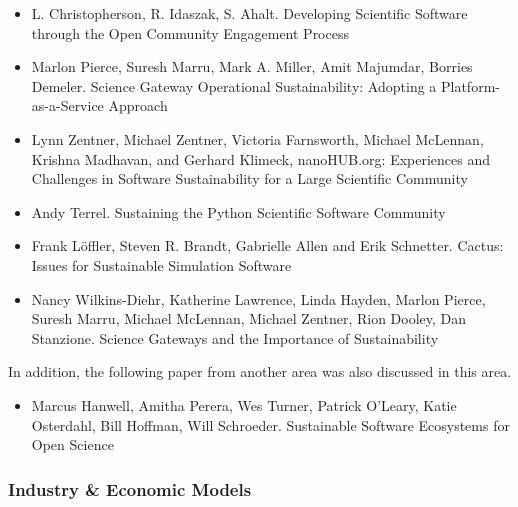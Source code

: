 \documentclass[11pt, oneside]{amsart}
\begin{document}
\begin{itemize}

\item L. Christopherson, R. Idaszak, S. Ahalt. Developing Scientific Software through the Open Community Engagement Process~\cite{Christopherson_WSSSPE}

\item Marlon Pierce, Suresh Marru, Mark A. Miller, Amit Majumdar, Borries Demeler. Science Gateway Operational Sustainability: Adopting a Platform-as-a-Service Approach~\cite{Pierce2_WSSSPE}

\item Lynn Zentner, Michael Zentner, Victoria Farnsworth, Michael
  McLennan, Krishna Madhavan, and Gerhard Klimeck, nanoHUB.org:
  Experiences and Challenges in Software Sustainability for a Large
  Scientific Community~\cite{Zentner_WSSSPE}

\item Andy Terrel. Sustaining the Python Scientific Software Community~\cite{Terrel_WSSSPE}

\item Frank L\"{o}ffler, Steven R. Brandt, Gabrielle Allen and Erik
  Schnetter. Cactus: Issues for Sustainable Simulation Software~\cite{Loffler_WSSSPE}

\item Nancy Wilkins-Diehr, Katherine Lawrence, Linda Hayden, Marlon Pierce, Suresh Marru, Michael McLennan, Michael Zentner, Rion Dooley, Dan Stanzione. Science Gateways and the Importance of Sustainability~\cite{Wilkins-Diehr_WSSSPE}

\end{itemize}

In addition, the following paper from another area was also discussed
in this area.

\begin{itemize}

\item Marcus Hanwell, Amitha Perera, Wes Turner, Patrick O'Leary,
  Katie Osterdahl, Bill Hoffman, Will Schroeder. Sustainable Software
  Ecosystems for Open Science~\cite{Hanwell_WSSSPE}

\end{itemize}

\subsubsection*{Industry \& Economic Models}
\end{document}
